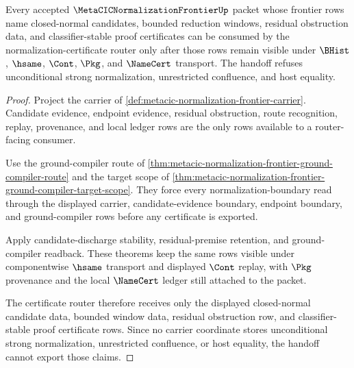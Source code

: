 \begin{theorem}
\label{thm:metacic-normalization-frontier-certificate-router-handoff}
Every accepted $\MetaCICNormalizationFrontierUp$ packet whose frontier rows name closed-normal candidates, bounded reduction windows, residual obstruction data, and classifier-stable proof certificates can be consumed by the normalization-certificate router only after those rows remain visible under $\BHist$, $\hsame$, $\Cont$, $\Pkg$, and $\NameCert$ transport. The handoff refuses unconditional strong normalization, unrestricted confluence, and host equality.
\end{theorem}
\begin{proof}
Project the carrier of \autoref{def:metacic-normalization-frontier-carrier}. Candidate evidence, endpoint evidence, residual obstruction, route recognition, replay, provenance, and local ledger rows are the only rows available to a router-facing consumer.

Use the ground-compiler route of \autoref{thm:metacic-normalization-frontier-ground-compiler-route} and the target scope of \autoref{thm:metacic-normalization-frontier-ground-compiler-target-scope}. They force every normalization-boundary read through the displayed carrier, candidate-evidence boundary, endpoint boundary, and ground-compiler rows before any certificate is exported.

Apply candidate-discharge stability, residual-premise retention, and ground-compiler readback. These theorems keep the same rows visible under componentwise $\hsame$ transport and displayed $\Cont$ replay, with $\Pkg$ provenance and the local $\NameCert$ ledger still attached to the packet.

The certificate router therefore receives only the displayed closed-normal candidate data, bounded window data, residual obstruction row, and classifier-stable proof certificate rows. Since no carrier coordinate stores unconditional strong normalization, unrestricted confluence, or host equality, the handoff cannot export those claims.
\end{proof}
